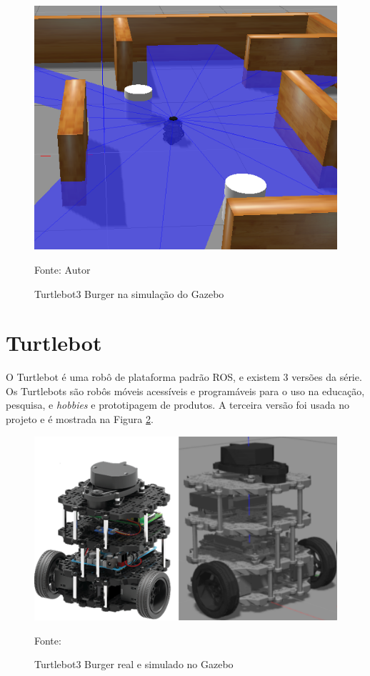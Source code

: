 \begin{figure}[H]
\caption{Turtlebot3 Burger na simulação do Gazebo}
\centerline{\includegraphics[width=\columnwidth]{imagens/gazebo.png}}
\small{Fonte: Autor}
\label{fig:gazebo}
\end{figure}

\section{Turtlebot}

O Turtlebot é uma robô de plataforma padrão ROS, e existem 3 versões da série.
Os Turtlebots são robôs móveis acessíveis e programáveis para o uso na educação, pesquisa, e \textit{hobbies} e prototipagem de produtos. A terceira versão foi usada no projeto e é mostrada na Figura \ref{fig:burger}.

\begin{figure}[H]
\caption{Turtlebot3 Burger real e simulado no Gazebo}
\centerline{\includegraphics[width=\columnwidth]{imagens/burger.png}}
\small{Fonte: \cite{robotisemanual}}
\label{fig:burger}
\end{figure}

